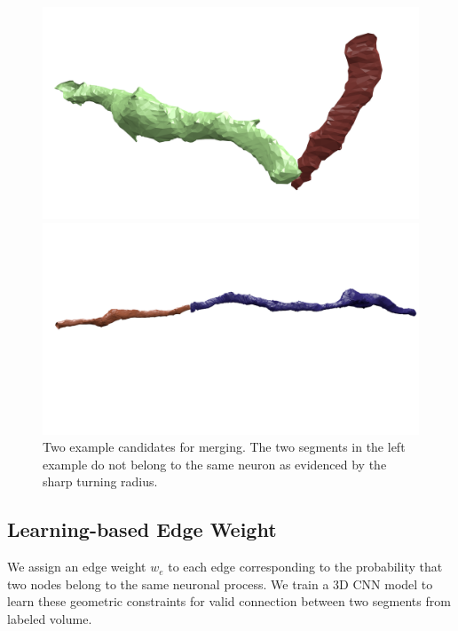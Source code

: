 \begin{figure}[t]
	\begin{minipage}{0.45\linewidth}
		\includegraphics[width=\linewidth]{./figures/constraint_error.png}
	\end{minipage}
	\hfill
	\begin{minipage}{0.45\linewidth}
		\includegraphics[width=\linewidth]{./figures/constraint_success.png}
	\end{minipage}
	\caption{Two example candidates for merging. The two segments in the left example do not belong to the same neuron as evidenced by the sharp turning radius.}
	\label{fig:turn-radii}
\end{figure}
\subsection{Learning-based Edge Weight}
\label{sec:edge-weights}
We assign an edge weight $w_e$ to each edge corresponding to the probability that two nodes belong to the same neuronal process.
We train a 3D CNN model to learn these geometric constraints for valid connection between two segments from labeled volume.

